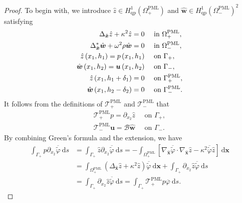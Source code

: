 \documentclass[final,3p,times]{elsarticle}
\begin{document}
\begin{proof}
	To begin with, we introduce $\hat{z} \in H_{\mathrm{qp}}^1\left(\Omega_+^{\mathrm{PML}}\right)$ and $\hat{\boldsymbol{w}} \in H_{\mathrm{qp}}^1\left(\Omega_-^{\mathrm{PML}}\right)^2$ satisfying
	\begin{align*}
		\Delta_{\hat{\boldsymbol{x}}}  \hat{z} + \kappa^2 \hat{z}=0 & \quad\text { in } \Omega_+^{\mathrm{PML}}, \notag\\
		\Delta^*_{\hat{\boldsymbol{x}}}\hat{\boldsymbol{w}} +  \omega^2\rho \hat{\boldsymbol{w}} = 0 &\quad \text { in } \Omega^{\mathrm{PML}}_-, \notag\\
		\hat{z}\left(x_1, h_1\right)=p \left(x_1, h_1\right) & \quad \text { on } \Gamma_+, \\
		\hat{\boldsymbol{w}}\left(x_1, h_2\right)=\boldsymbol{u} \left(x_1, h_2\right) & \quad\text { on } \Gamma_-, \notag\\
		\hat{z}\left(x_1, h_1+\delta_1\right)=0 &\quad \text { on } \Gamma_+^{\mathrm{PML}},\notag \\
		\hat{\boldsymbol{w}}\left(x_1, h_2-\delta_2\right)=0 &\quad \text { on } \Gamma_-^{\mathrm{PML}}.\notag
	\end{align*}
	It follows from the definitions of $\mathscr{T}_+^\mathrm{PML}$ and $\mathscr{T}_-^{\mathrm{PML}}$ that
	\begin{align*}
		\mathscr{T}_+^{\mathrm{PML}} p=\partial_{x_2}{\hat{z}}  \quad \text { on } \Gamma_+,\\
		\mathscr{T}_-^{\mathrm{PML}} \boldsymbol{u}=\mathscr{B} \hat{\boldsymbol{w}} \quad \text { on } \Gamma_-.
	\end{align*}
	By combining Green's formula and the extension, we have
	\begin{align*}
		\int_{\Gamma_+} p  \partial_{x_2} \overline{\tilde{\varphi}} \mathrm{~d} s
		& = \int_{\Gamma_+} \hat{z}  \partial_{x_2} \overline{\tilde{\varphi}} \mathrm{~d} s  = -\int_{\Omega_+^{\mathrm{PML}}}\left[\nabla_{\hat{\boldsymbol{x}}} \overline{\tilde{\varphi}} \cdot \nabla_{\hat{\boldsymbol{x}}}  \hat{z}-\kappa^2\overline{\tilde{\varphi}} \hat{z}\right] \mathrm{~d} \boldsymbol{x} \\
		& =	\int_{\Omega_+^{\mathrm{PML}}} (\Delta_{\hat{\boldsymbol{x}}} \hat{z} + \kappa^2 \hat{z}) \overline{\tilde{\varphi}}\mathrm{~d} \boldsymbol{x} + \int_{\Gamma_+} \partial_{x_2}{\hat{z}} \overline{\tilde{\varphi}} \mathrm{~d} s\\
		&=\int_{\Gamma_+} \partial_{x_2}{\hat{z}}  \overline{\tilde{\varphi}} \mathrm{~d} s=\int_{\Gamma_+} \mathscr{T}_+^{\mathrm{PML}} p  \overline{\varphi} \mathrm{~d} s.

\end{align*}
\end{proof}
\end{document}
